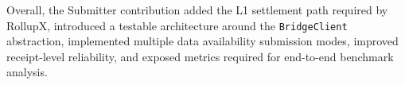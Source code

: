 Overall, the Submitter contribution added the L1 settlement path required by RollupX, introduced a testable architecture around the \texttt{BridgeClient} abstraction, implemented multiple data availability submission modes, improved receipt-level reliability, and exposed metrics required for end-to-end benchmark analysis.

